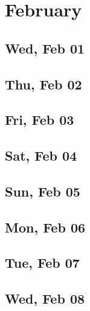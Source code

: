 \chapter{February}
	\section{Wed, Feb 01}
		
		
	\section{Thu, Feb 02}
		
		
	\section{Fri, Feb 03}
		
		
	\section{Sat, Feb 04}
		
		
	\section{Sun, Feb 05}
		
		
	\section{Mon, Feb 06}
		
		
	\section{Tue, Feb 07}
		
		
	\section{Wed, Feb 08}
		
		
